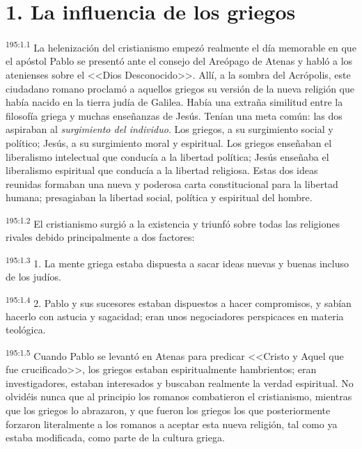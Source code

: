 \section*{1. La influencia de los griegos}
\par 
\textsuperscript{195:1.1} La helenización del cristianismo empezó realmente el día memorable en que el apóstol Pablo se presentó ante el consejo del Areópago de Atenas y habló a los atenienses sobre el <<Dios Desconocido>>. Allí, a la sombra del Acrópolis, este ciudadano romano proclamó a aquellos griegos su versión de la nueva religión que había nacido en la tierra judía de Galilea. Había una extraña similitud entre la filosofía griega y muchas enseñanzas de Jesús. Tenían una meta común: las dos aspiraban al \textit{surgimiento del individuo}. Los griegos, a su surgimiento social y político; Jesús, a su surgimiento moral y espiritual. Los griegos enseñaban el liberalismo intelectual que conducía a la libertad política; Jesús enseñaba el liberalismo espiritual que conducía a la libertad religiosa. Estas dos ideas reunidas formaban una nueva y poderosa carta constitucional para la libertad humana; presagiaban la libertad social, política y espiritual del hombre.

\par 
\textsuperscript{195:1.2} El cristianismo surgió a la existencia y triunfó sobre todas las religiones rivales debido principalmente a dos factores:

\par 
\textsuperscript{195:1.3} 1. La mente griega estaba dispuesta a sacar ideas nuevas y buenas incluso de los judíos.

\par 
\textsuperscript{195:1.4} 2. Pablo y sus sucesores estaban dispuestos a hacer compromisos, y sabían hacerlo con astucia y sagacidad; eran unos negociadores perspicaces en materia teológica.

\par 
\textsuperscript{195:1.5} Cuando Pablo se levantó en Atenas para predicar <<Cristo y Aquel que fue crucificado>>, los griegos estaban espiritualmente hambrientos; eran investigadores, estaban interesados y buscaban realmente la verdad espiritual. No olvidéis nunca que al principio los romanos combatieron el cristianismo, mientras que los griegos lo abrazaron, y que fueron los griegos los que posteriormente forzaron literalmente a los romanos a aceptar esta nueva religión, tal como ya estaba modificada, como parte de la cultura griega.

